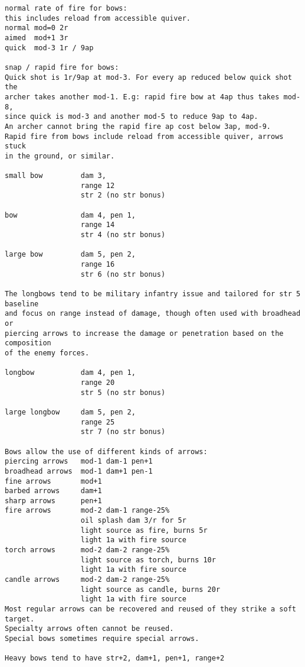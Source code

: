 \small \begin{verbatim}
normal rate of fire for bows:
this includes reload from accessible quiver.
normal mod=0 2r
aimed  mod+1 3r
quick  mod-3 1r / 9ap

snap / rapid fire for bows:
Quick shot is 1r/9ap at mod-3. For every ap reduced below quick shot the
archer takes another mod-1. E.g: rapid fire bow at 4ap thus takes mod-8, 
since quick is mod-3 and another mod-5 to reduce 9ap to 4ap.
An archer cannot bring the rapid fire ap cost below 3ap, mod-9.
Rapid fire from bows include reload from accessible quiver, arrows stuck 
in the ground, or similar.

small bow         dam 3,
                  range 12
                  str 2 (no str bonus)

bow               dam 4, pen 1,
                  range 14
                  str 4 (no str bonus)

large bow         dam 5, pen 2,
                  range 16
                  str 6 (no str bonus)

The longbows tend to be military infantry issue and tailored for str 5 baseline 
and focus on range instead of damage, though often used with broadhead or 
piercing arrows to increase the damage or penetration based on the composition 
of the enemy forces.

longbow           dam 4, pen 1,
                  range 20
                  str 5 (no str bonus)

large longbow     dam 5, pen 2,
                  range 25
                  str 7 (no str bonus)

Bows allow the use of different kinds of arrows:
piercing arrows   mod-1 dam-1 pen+1
broadhead arrows  mod-1 dam+1 pen-1
fine arrows       mod+1
barbed arrows     dam+1
sharp arrows      pen+1
fire arrows       mod-2 dam-1 range-25%
                  oil splash dam 3/r for 5r
                  light source as fire, burns 5r
                  light 1a with fire source
torch arrows      mod-2 dam-2 range-25%
                  light source as torch, burns 10r
                  light 1a with fire source
candle arrows     mod-2 dam-2 range-25%
                  light source as candle, burns 20r
                  light 1a with fire source
Most regular arrows can be recovered and reused of they strike a soft target.
Specialty arrows often cannot be reused.
Special bows sometimes require special arrows.

Heavy bows tend to have str+2, dam+1, pen+1, range+2



\end{verbatim}
